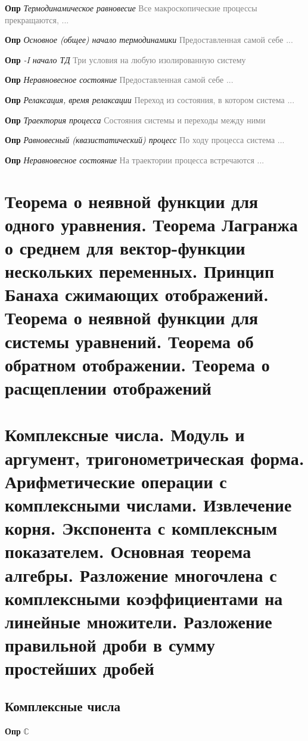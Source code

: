 \documentclass[a4paper, 14pt]{article}
\begin{document}
    \textbf{Опр} \textit{Термодинамическое равновесие} \textcolor{gray}{Все макроскопические процессы прекращаются, ...}

    \textbf{Опр} \textit{Основное (общее) начало термодинамики} \textcolor{gray}{Предоставленная самой себе ...}

    \textbf{Опр} \textit{-I начало ТД} \textcolor{gray}{Три условия на любую изолированную систему}

    \textbf{Опр} \textit{Неравновесное состояние} \textcolor{gray}{Предоставленная самой себе ...}

    \textbf{Опр} \textit{Релаксация, время релаксации} \textcolor{gray}{Переход из состояния, в котором система ...}

    \textbf{Опр} \textit{Траектория процесса} \textcolor{gray}{Состояния системы и переходы между ними}

    \textbf{Опр} \textit{Равновесный (квазистатический) процесс} \textcolor{gray}{По ходу процесса система ...}

    \textbf{Опр} \textit{Неравновесное состояние} \textcolor{gray}{На траектории процесса встречаются ...}

    \section{Теорема о неявной функции для одного уравнения.
    Теорема Лагранжа о среднем для вектор-функции нескольких переменных.
    Принцип Банаха сжимающих отображений.
    Теорема о неявной функции для системы уравнений.
    Теорема об обратном отображении.
    Теорема о расщеплении отображений}

    

    \section{Комплексные числа.
    Модуль и аргумент, тригонометрическая форма.
    Арифметические операции с комплексными числами.
    Извлечение корня.
    Экспонента с комплексным показателем.
    Основная теорема алгебры.
    Разложение многочлена с комплексными коэффициентами на линейные множители.
    Разложение правильной дроби в сумму простейших дробей}

    \subsection{Комплексные числа}

    \textbf{Опр} \textit{$\mathbb{C}$}
\end{document}
